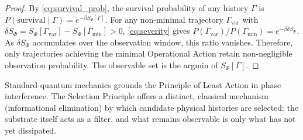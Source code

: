 \begin{proof}
By \cref{eq:survival_prob}, the survival probability of any history $\Gamma$ is $P(\text{survival} \mid \Gamma) = e^{-\beta S_\Phi[\Gamma]}$. For any non-minimal trajectory $\Gamma_{\text{var}}$ with $\delta S_\Phi = S_\Phi[\Gamma_{\text{var}}] - S_\Phi[\Gamma_{\text{min}}] > 0$, \cref{eq:severity} gives $P(\Gamma_{\text{var}})/P(\Gamma_{\text{min}}) = e^{-\beta \delta S_\Phi}$. As $\delta S_\Phi$ accumulates over the observation window, this ratio vanishes. Therefore, only trajectories achieving the minimal Operational Action retain non-negligible observation probability. The observable set is the argmin of $S_\Phi[\Gamma]$.
\end{proof}

Standard quantum mechanics grounds the Principle of Least Action in phase interference. The Selection Principle offers a distinct, classical mechanism (informational elimination) by which candidate physical histories are selected: the substrate itself acts as a filter, and what remains observable is only what has not yet dissipated.